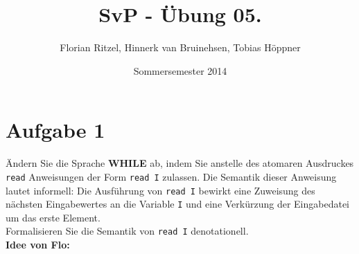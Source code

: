 \documentclass[ngerman,a4paper]{report}
\author{Florian Ritzel, Hinnerk van Bruinehsen, Tobias Höppner}
\title{SvP - Übung 05. }
\date{Sommersemester 2014}
\renewcommand{\maketitle}{}
\begin{document}
\maketitle
\section*{Aufgabe 1}
Ändern Sie die Sprache \textbf{WHILE} ab, indem Sie anstelle des atomaren Ausdruckes \lstinline!read! Anweisungen der Form \lstinline!read I! zulassen. Die Semantik dieser Anweisung lautet informell: Die Ausführung von \lstinline!read I! bewirkt eine Zuweisung des nächsten Eingabewertes an die Variable \lstinline!I! und eine Verkürzung der Eingabedatei um das erste Element.\\
Formalisieren Sie die Semantik von \lstinline!read I! denotationell.\\

\textbf{Idee von Flo:}\\
\end{document}
